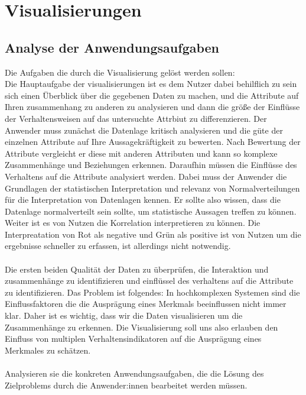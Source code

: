 \documentclass[usegeometry=true]{scrartcl}
\begin{document}
   
\newpage
\section{Visualisierungen}
\subsection{Analyse der Anwendungsaufgaben}
Die Aufgaben die durch die Visualisierung gelöst werden sollen: \\ 
 Die Hauptaufgabe der visualisierungen ist es dem Nutzer dabei behilflich zu sein sich 
einen Überblick über die gegebenen Daten zu machen, und die Attribute auf Ihren zusammenhang zu anderen
zu analysieren und dann die größe der Einflüsse der Verhaltensweisen auf das untersuchte Attrbiut zu differenzieren. 
Der Anwender muss zunächst die Datenlage kritisch analysieren und die güte der einzelnen Attribute auf Ihre Aussagekräftigkeit zu bewerten. 
Nach Bewertung der Attribute vergleicht er diese mit anderen Attributen und kann so komplexe Zusammenhänge und Beziehungen erkennen. 
Daraufhin müssen die Einflüsse des Verhaltens auf die Attribute analysiert werden.
Dabei muss der Anwender die Grundlagen der statistischen Interpretation und relevanz
von Normalverteilungen für die Interpretation von Datenlagen kennen. Er sollte also wissen, dass die Datenlage normalverteilt sein sollte, um statistische Aussagen treffen zu können.
Weiter ist es von Nutzen die Korrelation interpretieren zu können. 
Die Interpreatation von Rot als negative und Grün als positive ist von Nutzen um die ergebnisse schneller zu erfassen, ist allerdings nicht notwendig.
\\
\\
Die ersten beiden Qualität der Daten zu überprüfen, die Interaktion und zusammenhänge zu identifizieren und einflüssel des verhaltens auf die Attribute zu identifizieren. 
Das Problem ist folgendes: In hochkomplexen Systemen sind die Einflussfaktoren
 die die Ausprägung eines Merkmals beeinflussen nicht immer klar. Daher ist es wichtig, 
 dass wir die Daten visualisieren um die Zusammenhänge zu erkennen.
Die Visualisierung soll uns also erlauben den Einfluss von multiplen Verhaltensindikatoren auf die Ausprägung eines Merkmales zu schätzen.
\\
\\
Analysieren sie die konkreten Anwendungsaufgaben, die die Lösung des Zielproblems durch die Anwender:innen bearbeitet werden müssen. 
\end{document}
